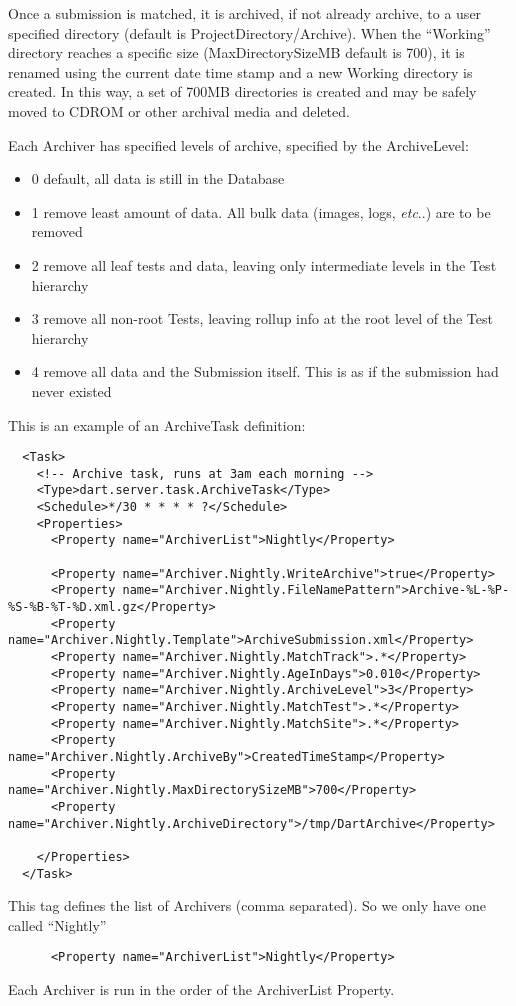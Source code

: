 \documentclass{InsightBook}
\makeatletter
\DeclareRobustCommand\onedot{\futurelet\@let@token\@onedot}
\def\@onedot{\ifx\@let@token.\else.\xspace\fi}
\def\etc{\emph{etc}\onedot}
\makeatother
\begin{document}
Once a submission is matched, it is archived, if not already archive, to a user specified directory (default is ProjectDirectory/Archive).  When the ``Working'' directory reaches a specific size (MaxDirectorySizeMB default is 700), it is renamed using the current date time stamp and a new Working directory is created.  In this way, a set of 700MB directories is created and may be safely moved to CDROM or other archival media and deleted.

Each Archiver has specified levels of archive, specified by the ArchiveLevel:

\begin{itemize}
\item 0 default, all data is still in the Database
\item 1 remove least amount of data.  All bulk data (images, logs, \etc) are to be removed
\item 2 remove all leaf tests and data, leaving only intermediate levels in the Test hierarchy
\item 3 remove all non-root Tests, leaving rollup info at the root level of the Test hierarchy
\item 4 remove all data and the Submission itself.  This is as if the submission had never existed
\end{itemize}

This is an example of an ArchiveTask definition:
\begin{verbatim}
  <Task>
    <!-- Archive task, runs at 3am each morning -->
    <Type>dart.server.task.ArchiveTask</Type>
    <Schedule>*/30 * * * * ?</Schedule>
    <Properties>
      <Property name="ArchiverList">Nightly</Property>

      <Property name="Archiver.Nightly.WriteArchive">true</Property>
      <Property name="Archiver.Nightly.FileNamePattern">Archive-%L-%P-%S-%B-%T-%D.xml.gz</Property>
      <Property name="Archiver.Nightly.Template">ArchiveSubmission.xml</Property>
      <Property name="Archiver.Nightly.MatchTrack">.*</Property>
      <Property name="Archiver.Nightly.AgeInDays">0.010</Property>
      <Property name="Archiver.Nightly.ArchiveLevel">3</Property>
      <Property name="Archiver.Nightly.MatchTest">.*</Property>
      <Property name="Archiver.Nightly.MatchSite">.*</Property>
      <Property name="Archiver.Nightly.ArchiveBy">CreatedTimeStamp</Property>
      <Property name="Archiver.Nightly.MaxDirectorySizeMB">700</Property>
      <Property name="Archiver.Nightly.ArchiveDirectory">/tmp/DartArchive</Property>
      
    </Properties>
  </Task>
\end{verbatim}
This tag defines the list of Archivers (comma separated).  So we only
have one called ``Nightly''
\begin{verbatim}
      <Property name="ArchiverList">Nightly</Property>
\end{verbatim}
Each Archiver is run in the order of the ArchiverList Property.
\end{document}
